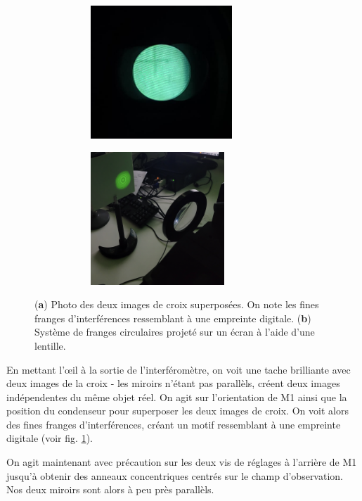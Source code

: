 \documentclass{article}
\begin{document}
\begin{figure}
    \centering
    \begin{subfigure}[b]{0.8\textwidth}
        \begin{subfigure}[b]{0.45\textwidth}
            \includegraphics[height=5cm]{figs/croix.jpeg}
            \caption{}\label{fig:croix}
        \end{subfigure}
        \hfill
        \begin{subfigure}[b]{0.45\textwidth}
            \includegraphics[height=5cm]{figs/anneaux.png}
            \caption{}\label{fig:anneaux}
        \end{subfigure}
    \end{subfigure}
    \caption{(\textbf{a}) Photo des deux images de croix superposées. On note les fines franges 
    d'interférences ressemblant à une empreinte digitale. (\textbf{b}) Système de franges circulaires projeté sur un écran à l'aide d'une lentille.}
\end{figure}

En mettant l'œil à la sortie de l'interféromètre, on voit une tache brilliante avec deux images de la croix - les miroirs n'étant pas parallèls, créent deux images indépendentes du même objet réel. On agit sur 
l'orientation de M1 ainsi que la position du condenseur pour superposer les deux images de croix. 
On voit alors des fines franges d'interférences, créant un motif ressemblant à une empreinte digitale (voir fig. \ref{fig:croix}).

On agit maintenant avec précaution sur les deux vis de réglages à l'arrière de M1 jusqu'à obtenir des anneaux concentriques 
centrés sur le champ d'observation. Nos deux miroirs sont alors à peu près parallèls.
\end{document}
